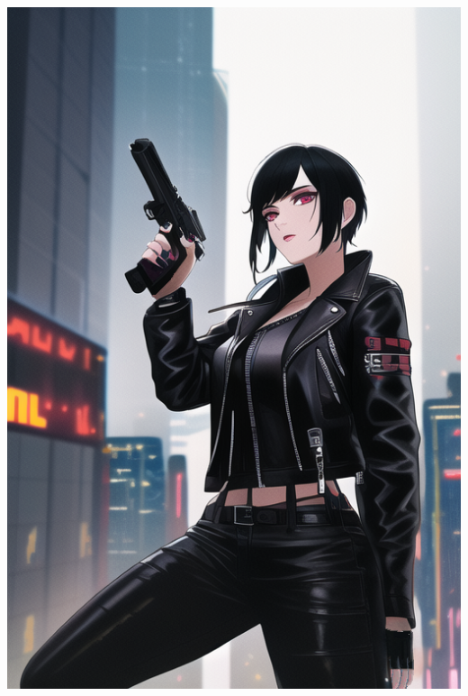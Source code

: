 \documentclass{article}
\begin{document}
	\includegraphics*{razor_girl.png}
	
	
	\newpage
	
	
	\newpage
	
	
	
\end{document}
